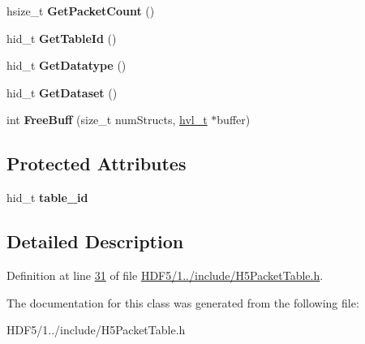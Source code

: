 \begin{DoxyCompactItemize}
hsize\+\_\+t {\bfseries Get\+Packet\+Count} ()
\item 
\mbox{\label{class_packet_table_aa394753fa243b46bcb7281b7db17ea85}} 
hid\+\_\+t {\bfseries Get\+Table\+Id} ()
\item 
\mbox{\label{class_packet_table_a4726b9377b162dcf766d54b6eb84cda2}} 
hid\+\_\+t {\bfseries Get\+Datatype} ()
\item 
\mbox{\label{class_packet_table_abdb20b9cf3762510694195a80df5b954}} 
hid\+\_\+t {\bfseries Get\+Dataset} ()
\item 
\mbox{\label{class_packet_table_a80dcdb99ff5b997dbe1b0927e3b01fb8}} 
int {\bfseries Free\+Buff} (size\+\_\+t num\+Structs, \hyperlink{structhvl__t}{hvl\+\_\+t} $\ast$buffer)
\end{DoxyCompactItemize}
\subsection*{Protected Attributes}
\begin{DoxyCompactItemize}
\item 
\mbox{\label{class_packet_table_a1b8ef32b8bdb487339e3fae3f5393aa8}} 
hid\+\_\+t {\bfseries table\+\_\+id}
\end{DoxyCompactItemize}


\subsection{Detailed Description}


Definition at line \hyperlink{_h_d_f5_21_810_81_2include_2_h5_packet_table_8h_source_l00031}{31} of file \hyperlink{_h_d_f5_21_810_81_2include_2_h5_packet_table_8h_source}{H\+D\+F5/1../include/\+H5\+Packet\+Table.\+h}.



The documentation for this class was generated from the following file\+:\begin{DoxyCompactItemize}
\item 
H\+D\+F5/1../include/\+H5\+Packet\+Table.\+h\end{DoxyCompactItemize}
